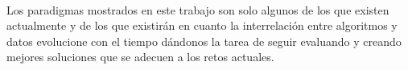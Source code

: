 \documentclass[12pt]{article}
\begin{document}
	\paragraph{}
	Los paradigmas mostrados en este trabajo son solo algunos de los que existen actualmente y de los que existirán en cuanto la interrelación entre algoritmos y datos evolucione con el tiempo dándonos la tarea de seguir evaluando y creando mejores soluciones que se adecuen a los retos actuales.
	
	
	
\end{document}
